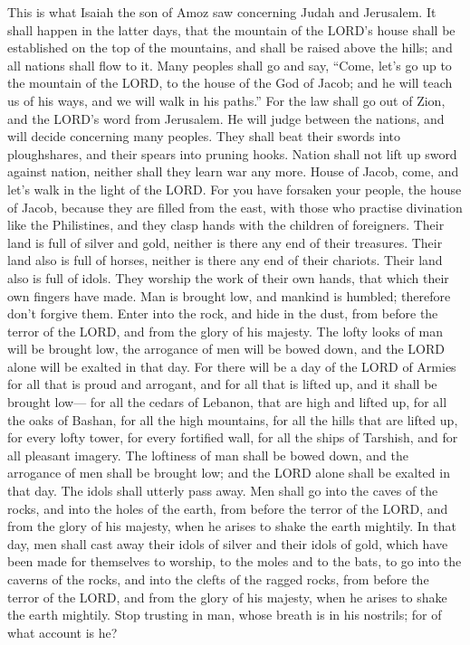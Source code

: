  This is what Isaiah the son of Amoz saw concerning Judah
and Jerusalem.  It shall happen in the latter days, that
the mountain of the LORD's house shall be established on the top of the
mountains, and shall be raised above the hills; and all nations shall
flow to it.  Many peoples shall go and say, ``Come, let's
go up to the mountain of the LORD, to the house of the God of Jacob; and
he will teach us of his ways, and we will walk in his paths.'' For the
law shall go out of Zion, and the LORD's word from Jerusalem.
 He will judge between the nations, and will decide
concerning many peoples. They shall beat their swords into ploughshares,
and their spears into pruning hooks. Nation shall not lift up sword
against nation, neither shall they learn war any more. 
House of Jacob, come, and let's walk in the light of the LORD.
 For you have forsaken your people, the house of Jacob,
because they are filled from the east, with those who practise
divination like the Philistines, and they clasp hands with the children
of foreigners.  Their land is full of silver and gold,
neither is there any end of their treasures. Their land also is full of
horses, neither is there any end of their chariots.  Their
land also is full of idols. They worship the work of their own hands,
that which their own fingers have made.  Man is brought
low, and mankind is humbled; therefore don't forgive them.
 Enter into the rock, and hide in the dust, from before
the terror of the LORD, and from the glory of his majesty.
 The lofty looks of man will be brought low, the
arrogance of men will be bowed down, and the LORD alone will be exalted
in that day.  For there will be a day of the LORD of
Armies for all that is proud and arrogant, and for all that is lifted
up, and it shall be brought low---  for all the cedars of
Lebanon, that are high and lifted up, for all the oaks of Bashan,
 for all the high mountains, for all the hills that are
lifted up,  for every lofty tower, for every fortified
wall,  for all the ships of Tarshish, and for all
pleasant imagery.  The loftiness of man shall be bowed
down, and the arrogance of men shall be brought low; and the LORD alone
shall be exalted in that day.  The idols shall utterly
pass away.  Men shall go into the caves of the rocks, and
into the holes of the earth, from before the terror of the LORD, and
from the glory of his majesty, when he arises to shake the earth
mightily.  In that day, men shall cast away their idols
of silver and their idols of gold, which have been made for themselves
to worship, to the moles and to the bats,  to go into the
caverns of the rocks, and into the clefts of the ragged rocks, from
before the terror of the LORD, and from the glory of his majesty, when
he arises to shake the earth mightily.  Stop trusting in
man, whose breath is in his nostrils; for of what account is he?

